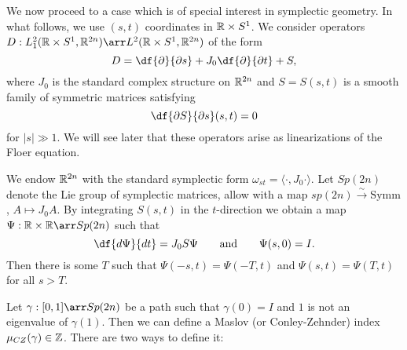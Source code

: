 \bigskip

We now proceed to a case which is of special interest in symplectic geometry. In what follows, we use $(s,t)$ coordinates in $\mathbb{R} \times S^1$. We consider operators $D:L_1^2(\R \times S^1, \R^{2n}) \arr L^2(\R \times S^1, \R^{2n})$ of the form 
\[
D = \df{\partial}{\partial s} + J_0 \df{\partial}{\partial t} + S,
\]
where $J_0$ is the standard complex structure on $\mathbb{R}^{2n}$ and $S=S(s,t)$ is a smooth family of symmetric matrices satisfying
\[
\df{\partial S}{\partial s}(s,t) = 0
\]
for $|s| \gg 1$. We will see later that these operators arise as linearizations of the Floer equation.

We endow $\mathbb{R}^{2n}$ with the standard symplectic form $\omega_{st} = \langle \cdot, J_0 \cdot \rangle$. Let $Sp(2n)$ denote the Lie group of symplectic matrices, allow with a map $sp(2n) \xrightarrow{\sim} \text{Symm}$, $A \mapsto J_0A$. By integrating $S(s,t)$ in the $t$-direction we obtain a map $\Psi: \R \times \R \arr Sp(2n)$ such that
\[
\df{d\Psi}{dt} = J_0 S \Psi \qquad \text{and} \qquad \Psi(s,0) = I.
\]
Then there is some $T$ such that $\Psi(-s,t)=\Psi(-T,t)$ and $\Psi(s,t)=\Psi(T,t)$ for all $s>T$.
\begin{center}
\end{center}
Let $\gamma:[0,1]\arr Sp(2n)$ be a path such that $\gamma(0)=I$ and $1$ is not an eigenvalue of $\gamma(1)$. Then we can define a Maslov (or Conley-Zehnder) index $\mu_{CZ}(\gamma) \in \mathbb{Z}$. There are two ways to define it:
